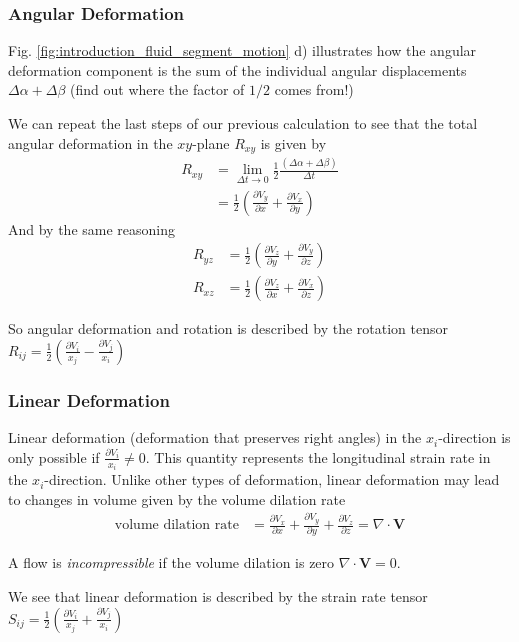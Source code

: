 \documentclass[a4paper, 12pt]{article}
\numberwithin{equation}{subsubsection}
\begin{document}
\subsubsection{Angular Deformation}

Fig. \ref{fig:introduction_fluid_segment_motion} d) illustrates how the angular deformation component is the sum of the individual angular displacements $\Delta \alpha + \Delta \beta$ (find out where the factor of $1/2$ comes from!)

We can repeat the last steps of our previous calculation to see that the total angular deformation in the $xy$-plane $R_{xy}$ is given by	
\begin{align}
	R_{xy} &= \lim_{\Delta t \rightarrow 0} \frac{1}{2} \frac{(\Delta \alpha + \Delta \beta)}{\Delta t} \\
	&= \frac{1}{2} \left(\frac{\partial V_y}{\partial x} + \frac{\partial V_x}{\partial y}\right)
\end{align}
And by the same reasoning
\begin{align}
	R_{yz} &= \frac{1}{2} \left(\frac{\partial V_z}{\partial y} + \frac{\partial V_y}{\partial z}\right) \\
	R_{xz} &= \frac{1}{2} \left(\frac{\partial V_z}{\partial x} + \frac{\partial V_x}{\partial z}\right)
\end{align}

So angular deformation and rotation is described by the rotation tensor $R_{ij} = \frac{1}{2} \left(\frac{\partial V_i}{x_j} - \frac{\partial V_j}{x_i} \right)$

\subsubsection{Linear Deformation}
Linear deformation (deformation that preserves right angles) in the $x_i$-direction is only possible if $\frac{\partial V_i}{x_i} \neq 0$. This quantity represents the longitudinal strain rate in the $x_i$-direction. Unlike other types of deformation, linear deformation may lead to changes in volume given by the volume dilation rate
\begin{align}
	\text{volume dilation rate} &= \frac{\partial V_x}{\partial x} + \frac{\partial V_y}{\partial y} + \frac{\partial V_z}{\partial z} = \nabla \cdot \mathbf{V}
\end{align}

A flow is \textit{incompressible} if the volume dilation is zero $\nabla \cdot \mathbf{V} = 0$. 

We see that linear deformation is described by the strain rate tensor $S_{ij} = \frac{1}{2} \left(\frac{\partial V_i}{x_j} + \frac{\partial V_j}{x_i} \right)$
\end{document}
